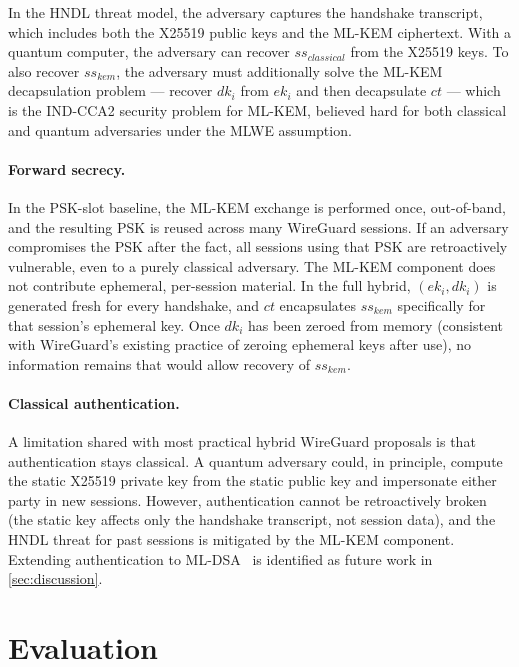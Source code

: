 \documentclass[11pt,a4paper]{article}
\begin{document}
In the HNDL threat model, the adversary captures the handshake transcript, which includes both the X25519 public keys and the ML-KEM ciphertext. With a quantum computer, the adversary can recover $\mathit{ss}_\mathit{classical}$ from the X25519 keys. To also recover $\mathit{ss}_\mathit{kem}$, the adversary must additionally solve the ML-KEM decapsulation problem --- recover $\mathit{dk}_i$ from $\mathit{ek}_i$ and then decapsulate $\mathit{ct}$ --- which is the IND-CCA2 security problem for ML-KEM, believed hard for both classical and quantum adversaries under the MLWE assumption.

\paragraph{Forward secrecy.} In the PSK-slot baseline, the ML-KEM exchange is performed once, out-of-band, and the resulting PSK is reused across many WireGuard sessions. If an adversary compromises the PSK after the fact, all sessions using that PSK are retroactively vulnerable, even to a purely classical adversary. The ML-KEM component does not contribute ephemeral, per-session material. In the full hybrid, $(\mathit{ek}_i, \mathit{dk}_i)$ is generated fresh for every handshake, and $\mathit{ct}$ encapsulates $\mathit{ss}_\mathit{kem}$ specifically for that session's ephemeral key. Once $\mathit{dk}_i$ has been zeroed from memory (consistent with WireGuard's existing practice of zeroing ephemeral keys after use), no information remains that would allow recovery of $\mathit{ss}_\mathit{kem}$.

\paragraph{Classical authentication.} A limitation shared with most practical hybrid WireGuard proposals is that authentication stays classical. A quantum adversary could, in principle, compute the static X25519 private key from the static public key and impersonate either party in new sessions. However, authentication cannot be retroactively broken (the static key affects only the handshake transcript, not session data), and the HNDL threat for past sessions is mitigated by the ML-KEM component. Extending authentication to ML-DSA~\cite{nistir8547} is identified as future work in \cref{sec:discussion}.

\section{Evaluation}
\label{sec:evaluation}
\end{document}
